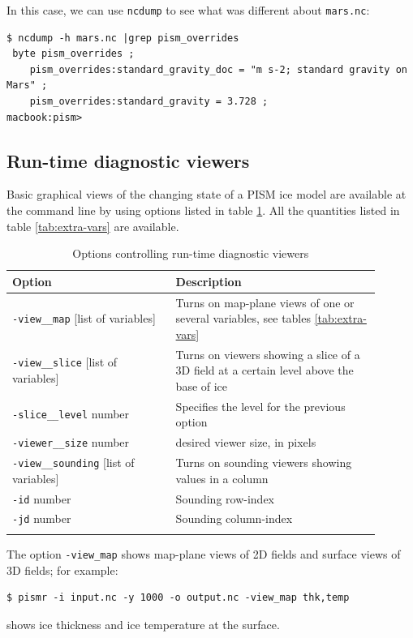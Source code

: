 \documentclass[11pt,final]{amsart}
\newcommand{\und}{\_\!\_}
\newcommand{\pismoptionindex}[1]{\index{options for PISM (and PETSc)!\texttt{-#1}}}
\newcommand{\intextoption}[1]{\texttt{-#1}\pismoptionindex{#1}}
\begin{document}
In this case, we can use \verb|ncdump| to see what was different about \verb|mars.nc|:
\small
\begin{verbatim}
$ ncdump -h mars.nc |grep pism_overrides
 byte pism_overrides ;
    pism_overrides:standard_gravity_doc = "m s-2; standard gravity on Mars" ;
    pism_overrides:standard_gravity = 3.728 ;
macbook:pism>
\end{verbatim}
\normalsize

\subsection{Run-time diagnostic viewers}
\label{sec:diagnostic-viewers}
Basic graphical views of the changing state of a PISM ice model are available at the command line by using options listed in table \ref{tab:diag-viewers}.
All the quantities listed in table \ref{tab:extra-vars} are available.
\begin{table}[ht]
  \caption{Options controlling run-time diagnostic viewers}
  \centering
  \begin{tabular}{p{0.4\linewidth}p{0.5\linewidth}}\hline
    \small
   \textbf{Option} & \textbf{Description}\\
    \hline
    \intextoption{view\und map} [list of variables] & Turns on map-plane views of one or several variables, see tables \ref{tab:extra-vars}  \\
    \intextoption{view\und slice} [list of variables] & Turns on viewers showing a slice of a 3D field at a certain level above the base of ice\\
    \intextoption{slice\und level} number& Specifies the level for the previous option\\
    \intextoption{viewer\und size} number & desired viewer size, in pixels\\
    \intextoption{view\und sounding} [list of variables] &Turns on sounding viewers showing values in a column\\
    \intextoption{id} number & Sounding row-index\\
    \intextoption{jd} number & Sounding column-index\\
    \hline
  \normalsize
  \end{tabular}
 \label{tab:diag-viewers}
\end{table}
The option \verb|-view_map| shows map-plane views of 2D fields and surface views of 3D fields; for example:
\begin{verbatim}
$ pismr -i input.nc -y 1000 -o output.nc -view_map thk,temp 
\end{verbatim}
shows ice thickness and ice temperature at the surface.
\end{document}
